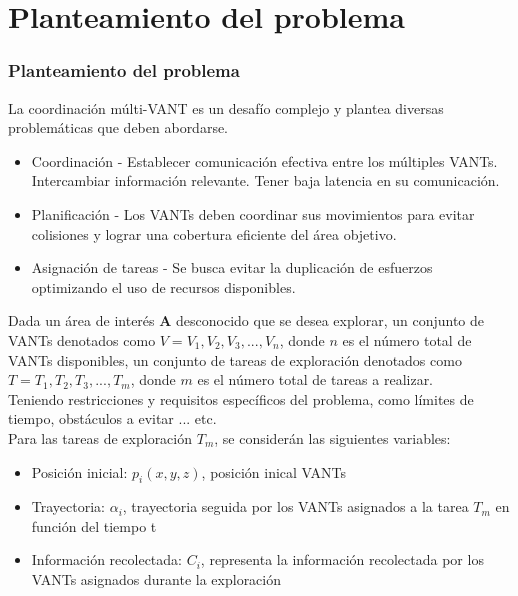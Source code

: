 \documentclass[
	11pt, %
]{beamer}
\begin{document}
\section{Planteamiento del problema}

\begin{frame}
  \frametitle{Planteamiento del problema}
  
  La coordinación múlti-VANT es un desafío complejo y plantea diversas problemáticas que deben abordarse.
  \bigskip %
  \begin{itemize}
  \item<1-> Coordinación - Establecer comunicación efectiva entre los múltiples VANTs. Intercambiar información relevante. Tener baja latencia en su comunicación.
  \item<2-> Planificación - Los VANTs deben coordinar sus movimientos para evitar colisiones y lograr una cobertura eficiente del área objetivo.
  \item<3-> Asignación de tareas - Se busca evitar la duplicación de esfuerzos optimizando el uso de recursos disponibles.
  \end{itemize}
  
\end{frame}

\begin{frame}
  Dada un área de interés \textbf{A} desconocido que se desea explorar, un conjunto de VANTs denotados como \textbf{$V=V_{1},V_{2},V_{3},...,V_{n}$}, donde $n$ es el número total de VANTs disponibles, un conjunto de tareas de exploración denotados como \textbf{$T=T_{1},T_{2},T_{3},...,T_{m}$}, donde $m$ es el número total de tareas a realizar.\\
  \bigskip %
  Teniendo restricciones y requisitos específicos del problema, como límites de tiempo, obstáculos a evitar ... etc.\\

  Para las tareas de exploración $T_{m}$, se considerán las siguientes variables:

  \begin{itemize}
  \item Posición inicial: $p_{i}(x,y,z)$, posición inical VANTs
  \item Trayectoria: $\alpha_{i}$, trayectoria seguida por los VANTs asignados a la tarea $T_{m}$ en función del tiempo t
  \item Información recolectada: $C_{i}$, representa la información recolectada por los VANTs asignados durante la exploración
  \end{itemize}
  
\end{frame}
\end{document}
